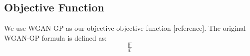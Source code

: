\subsection{Objective Function}
We use WGAN-GP as our objective objective function [reference]. The original WGAN-GP formula is defined as:
\begin{equation}
\underset{\mathbb{E}}{\mathbb{E}}
\end{equation}